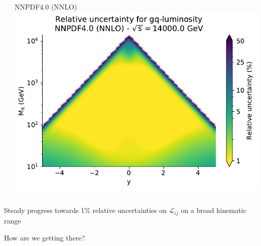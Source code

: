 \documentclass{beamer}
\begin{document}
\begin{frame}
\begin{overlayarea}{\textwidth}{5.2cm}
{\begin{columns}[c]
\begin{column}{0.5\textwidth}
   \end{column}
   \begin{column}{0.5\textwidth}
    \centering
        NNPDF4.0 (NNLO)\\
        \vspace{0.1cm}
        \includegraphics[width=\columnwidth]{plots/plot_lumi2d_uncertainty_NNPDF40_gq}\\    
   \end{column}
  \end{columns}  
  }   
 \end{overlayarea}
 \begin{alertblock}{}
  \centering
  Steady progress towards 1\% relative uncertainties on $\mathcal{L}_{ij}$ on a broad kinematic range\\
 \end{alertblock}
 \vspace{-0.1cm}
 \begin{block}{}
  \centering
  How are we getting there?\\
 \end{block}
\end{frame}
\end{document}
